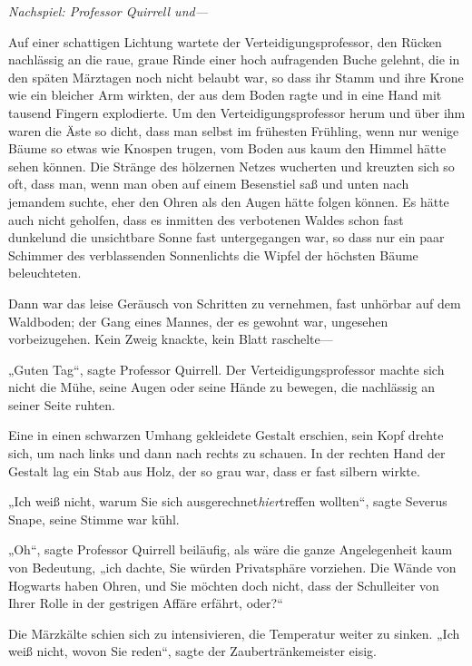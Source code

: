 {\emph{Nachspiel: Professor Quirrell und—}

Auf einer schattigen Lichtung wartete der Verteidigungsprofessor, den Rücken nachlässig an die raue, graue Rinde einer hoch aufragenden Buche gelehnt, die in den späten Märztagen noch nicht belaubt war, so dass ihr Stamm und ihre Krone wie ein bleicher Arm wirkten, der aus dem Boden ragte und in eine Hand mit tausend Fingern explodierte. Um den Verteidigungsprofessor herum und über ihm waren die Äste so dicht, dass man selbst im frühesten Frühling, wenn nur wenige Bäume so etwas wie Knospen trugen, vom Boden aus kaum den Himmel hätte sehen können. Die Stränge des hölzernen Netzes wucherten und kreuzten sich so oft, dass man, wenn man oben auf einem Besenstiel saß und unten nach jemandem suchte, eher den Ohren als den Augen hätte folgen können. Es hätte auch nicht geholfen, dass es inmitten des verbotenen Waldes schon fast dunkelund die unsichtbare Sonne fast untergegangen war, so dass nur ein paar Schimmer des verblassenden Sonnenlichts die Wipfel der höchsten Bäume beleuchteten.

Dann war das leise Geräusch von Schritten zu vernehmen, fast unhörbar auf dem Waldboden; der Gang eines Mannes, der es gewohnt war, ungesehen vorbeizugehen. Kein Zweig knackte, kein Blatt raschelte—

„Guten Tag“, sagte Professor Quirrell. Der Verteidigungsprofessor machte sich nicht die Mühe, seine Augen oder seine Hände zu bewegen, die nachlässig an seiner Seite ruhten.

Eine in einen schwarzen Umhang gekleidete Gestalt erschien, sein Kopf drehte sich, um nach links und dann nach rechts zu schauen. In der rechten Hand der Gestalt lag ein Stab aus Holz, der so grau war, dass er fast silbern wirkte.

„Ich weiß nicht, warum Sie sich ausgerechnet\emph{hier}treffen wollten“, sagte Severus Snape, seine Stimme war kühl.

„Oh“, sagte Professor Quirrell beiläufig, als wäre die ganze Angelegenheit kaum von Bedeutung, „ich dachte, Sie würden Privatsphäre vorziehen. Die Wände von Hogwarts haben Ohren, und Sie möchten doch nicht, dass der Schulleiter von Ihrer Rolle in der gestrigen Affäre erfährt, oder?“

Die Märzkälte schien sich zu intensivieren, die Temperatur weiter zu sinken. „Ich weiß nicht, wovon Sie reden“, sagte der Zaubertränkemeister eisig.

}
